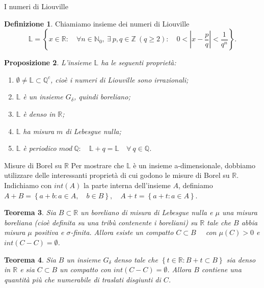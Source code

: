 \documentclass[intlimits]{beamer}
\numberwithin{equation}{section}
\theoremstyle{plain}
\newtheorem{teor}{Teorema}[section]
\newtheorem{prop}[teor]{Proposizione}
\theoremstyle{definition}
\newtheorem{defin}[teor]{Definizione}
\theoremstyle{remark}
\newcommand{\gra}[1]{\left\{#1\right\}}
\newcommand{\abs}[1]{\left\lvert#1\right\rvert}
\renewcommand{\geq}{\geqslant}
\begin{document}
\begin{frame}{I numeri di Liouville}
\begin{defin} Chiamiamo insieme dei numeri di Liouville
\[ \mathbb{L} = \gra{x \in \mathbb{R}: \quad\forall n \in \mathbb{N}_0,\ \exists\ p,q \in \mathbb{Z} \ (q \geq 2):
\quad 0 < \abs{x - \frac{p}{q}} < \frac{1}{q^n}}.\]\end{defin}
\pause
\begin{prop} L'insieme $\mathbb{L}$ ha le seguenti proprietà:
\pause
\begin{enumerate}
\item $\emptyset \neq \mathbb{L} \subset \mathbb{Q}^c$, cioè i numeri di Liouville sono irrazionali; \pause
\item  $\mathbb{L}$ è un insieme $G_\delta$, quindi boreliano;\pause
\item $\mathbb{L}$ è denso in $\mathbb{R}$;\pause
\item  $\mathbb{L}$ ha misura $m$ di Lebesgue nulla; \pause
\item   $\mathbb{L}$ è periodico $mod\ \mathbb{Q}: \quad  \mathbb{L} + q = \mathbb{L}  \quad \forall\ q \in \mathbb{Q}$.  
\end{enumerate}
\end{prop}
\end{frame}


\begin{frame}{Misure di Borel su $\mathbb{R}$}
Per mostrare che $\mathbb{L}$ è un insieme a-dimensionale, dobbiamo utilizzare delle
interessanti proprietà di cui godono le misure di Borel su $\mathbb{R}$.\\
\bigskip
\pause
Indichiamo con $int(A)$ la parte interna dell'insieme $A$, 
definiamo $A+B =\gra{ a+b: a \in A, \quad b \in B}, \quad A+t=\gra{ a+t:a \in A}$.\pause
\begin{teor}Sia $B\subset \mathbb{R}$ un boreliano di misura di Lebesgue nulla e $\mu$ una misura boreliana 
(cioè definita su una tribù contenente i boreliani) su $\mathbb{R}$ tale che $B$ abbia misura $\mu$ positiva e $\sigma$-finita. 
\pause Allora
esiste un compatto $C \subset B \quad$ con $\mu(C)>0$ e $int(C-C)=\emptyset$.\end{teor}\pause
\begin{teor}Sia $B$ un insieme $G_\delta$ denso tale che $\gra{t \in \mathbb{R}: B+t \subset B}$ sia denso in $\mathbb{R}$
e sia $C \subset B$ un compatto con $int(C-C)=\emptyset$. \pause Allora  $B$ contiene una quantità più 
che numerabile di traslati disgiunti di $C$.\end{teor}
\end{frame}
\end{document}
